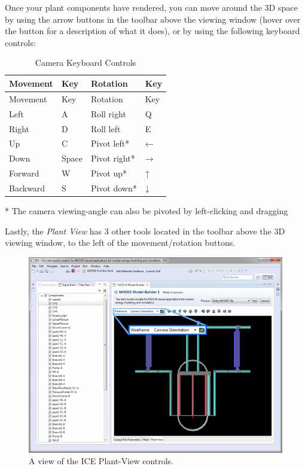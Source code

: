 Once your plant components have rendered, you can move around the 3D
space by using the arrow buttons in the toolbar above the viewing window
(hover over the button for a description of what it does), or by using
the following keyboard controls:

\begin{longtable}[c]{@{}llll@{}}
\caption{Camera Keyboard Controls}\tabularnewline
\toprule
Movement & Key & Rotation & Key\tabularnewline
\midrule
\endfirsthead
\toprule
Movement & Key & Rotation & Key\tabularnewline
\midrule
\endhead
Left & A & Roll right & Q\tabularnewline
Right & D & Roll left & E\tabularnewline
Up & C & Pivot left* & ←\tabularnewline
Down & Space & Pivot right* & →\tabularnewline
Forward & W & Pivot up* & ↑\tabularnewline
Backward & S & Pivot down* & ↓\tabularnewline
\bottomrule
\end{longtable}

* The camera viewing-angle can also be pivoted by left-clicking and
dragging

Lastly, the \emph{Plant View} has 3 other tools located in the toolbar
above the 3D viewing window, to the left of the movement/rotation
buttons.

\newpage

\begin{figure}[htbp]
\centering
\includegraphics[width=\textwidth]{figures/ICE_MOOSEPlantViewTools.png}
\caption{A view of the ICE Plant-View controls. }
\end{figure}

